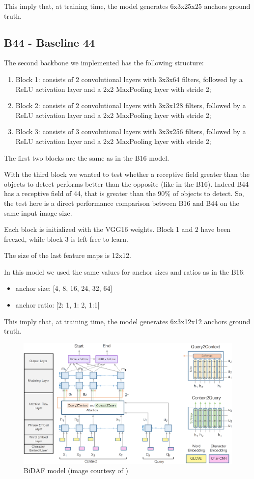 \documentclass[a4paper,10pt]{report}
\begin{document}
This imply that, at training time, the model generates 6x3x25x25 anchors ground truth.

\subsection{B44 - Baseline 44}\label{subsec:b44}
The second backbone we implemented has the following structure:
\begin{enumerate}
  \item Block 1: consists of 2 convolutional layers with 3x3x64 filters, followed by a ReLU activation layer and a 2x2 MaxPooling layer with stride 2;
  \item Block 2: consists of 2 convolutional layers with 3x3x128 filters, followed by a ReLU activation layer and a 2x2 MaxPooling layer with stride 2;
  \item Block 3: consists of 3 convolutional layers with 3x3x256 filters, followed by a ReLU activation layer and a 2x2 MaxPooling layer with stride 2;
\end{enumerate}
The first two blocks are the same as in the B16 model. 

With the third block we wanted to test whether a receptive field greater than the objects to detect performs better than the opposite (like in the B16).
Indeed B44 has a receptive field of 44, that is greater than the 90\% of objects to detect.
So, the test here is a direct performance comparison between B16 and B44 on the same input image size.

Each block is initialized with the VGG16 weights. Block 1 and 2 have been freezed, while block 3 is left free to learn.

The size of the last feature maps is 12x12.

In this model we used the same values for anchor sizes and ratios as in the B16:
\begin{itemize}
  \item anchor size: [4, 8, 16, 24, 32, 64]
  \item anchor ratio: [2: 1, 1: 2, 1:1]
\end{itemize}

This imply that, at training time, the model generates 6x3x12x12 anchors ground truth.

\begin{figure}[h]
  \center
  \includegraphics[width=0.85\linewidth]{bidaf}
  \caption{BiDAF model (image courtesy of \cite{bidaf})}
  \label{fig:bidaf}
\end{figure}
\end{document}
